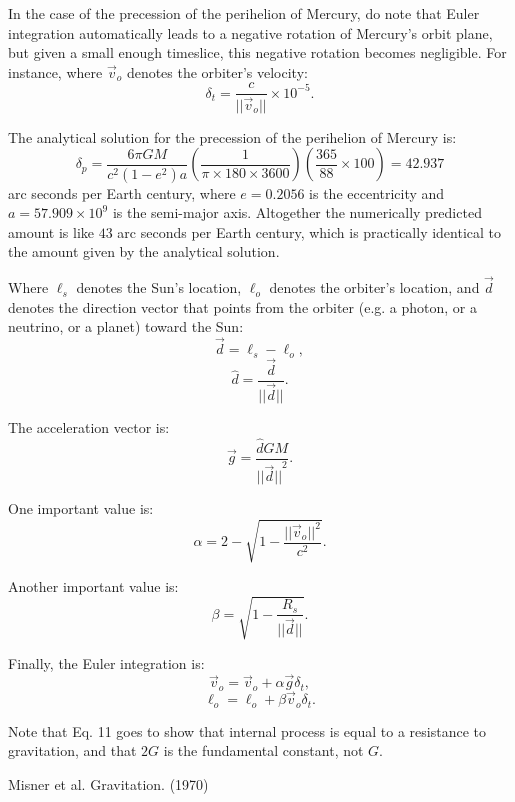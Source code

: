 \documentclass[12pt]{article}
\begin{document}
In the case of the precession of the perihelion of Mercury, do note that Euler integration automatically leads to a negative rotation of Mercury's orbit plane, but given a small enough timeslice, this negative rotation becomes negligible.
For instance, where $\vec{v}_{o}$ denotes the orbiter's velocity:
\begin{equation}
\delta_{t} = \frac{c}{\lvert\lvert \vec{v}_{o} \rvert \rvert} \times 10^{-5}.
\end{equation}

The analytical solution for the precession of the perihelion of Mercury is:
\begin{equation}
\delta_{p} = \frac{6 \pi G M}{c^2 (1 - e^2) a} \left( \frac{1}{ \pi \times 180 \times 3600} \right) \left( \frac{365}{88} \times 100 \right) = 42.937
\end{equation}
arc seconds per Earth century, where $e = 0.2056$ is the eccentricity and $a = 57.909 \times 10^9$ is the semi-major axis.
Altogether the numerically predicted amount is like $43$ arc seconds per Earth century, which is practically identical to the amount given by the analytical solution.

Where $\ell_s$ denotes the Sun's location, $\ell_o$ denotes the orbiter's location, and $\vec{d}$ denotes the direction vector that points from the orbiter (e.g. a photon, or a neutrino, or a planet) toward the Sun:
\begin{equation}
\vec{d} = \ell_{s} - \ell_{o},	
\end{equation}
\begin{equation}
\hat{d} = \frac{\vec{d}}{\lvert\lvert \vec{d} \rvert\rvert}.
\end{equation}

The acceleration vector is:
\begin{equation}
\vec{g} =  \frac{\hat{d} G M}{{\lvert\lvert \vec{d} \rvert\rvert}^2}.
\end{equation}

One important value is:
\begin{equation}
\alpha = 2 - \sqrt{1 - \frac{\lvert\lvert \vec{v}_{o}\rvert\rvert^2}{c^2}}.
\end{equation}

Another important value is:
\begin{equation}
\beta = \sqrt{1 - \frac{R_{s}}{\lvert \lvert \vec{d} \rvert \rvert}}.
\end{equation}

Finally, the Euler integration is:
\begin{equation}
\vec{v}_{o} = \vec{v}_{o} + \alpha \vec{g} \delta_{t},
\end{equation}
\begin{equation}
\ell_{o} = \ell_{o} + \beta \vec{v}_{o} \delta_{t}.
\end{equation}

Note that Eq. 11 goes to show that internal process is equal to a resistance to gravitation, and that $2G$ is the fundamental constant, not $G$.





\begin{thebibliography}{9}


 Misner et al. Gravitation. (1970)






\end{thebibliography}
\end{document}

